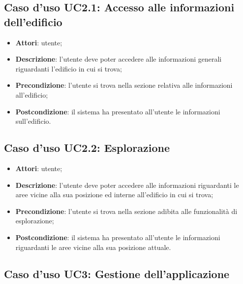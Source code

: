 \documentclass[../AnalisiDeiRequisiti.tex]{subfiles}
\begin{document}
\subsection{Caso d'uso UC2.1: Accesso alle informazioni dell'edificio}
\begin{itemize}
\item \textbf{Attori}: utente;
\item \textbf{Descrizione}: l'utente deve poter accedere alle informazioni generali riguardanti l'edificio in cui si trova; 
      \item \textbf{Precondizione}: l'utente si trova nella sezione relativa alle informazioni all'edificio;
    \item \textbf{Postcondizione}: il sistema ha presentato all'utente le informazioni sull'edificio.
  \end{itemize}
\hypertarget{UC2.2}{}
\subsection{Caso d'uso UC2.2: Esplorazione}
\begin{itemize}
\item \textbf{Attori}: utente;
\item \textbf{Descrizione}: l'utente deve poter accedere alle informazioni riguardanti le aree vicine alla sua posizione ed interne all'edificio in cui si trova; 
      \item \textbf{Precondizione}: l'utente si trova nella sezione adibita alle funzionalità di esplorazione;
    \item \textbf{Postcondizione}: il sistema ha presentato all'utente le informazioni riguardanti le aree vicine alla sua posizione attuale.
  \end{itemize}
\hypertarget{UC3}{}
\subsection{Caso d'uso UC3: Gestione dell'applicazione}
\end{document}
